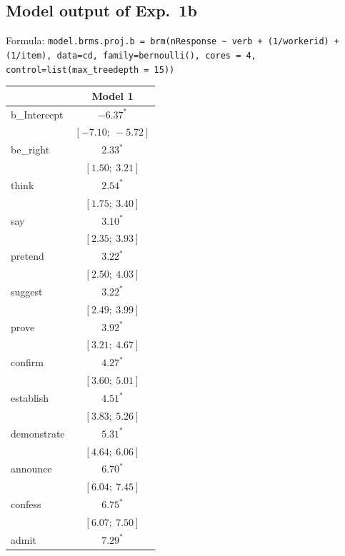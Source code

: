 \documentclass[11pt,fleqn]{article}
\newcommand{\6}{\mbox{$[\hspace*{-.6mm}[$}}
\newcommand{\9}{\mbox{$]\hspace*{-.6mm}]$}}
\begin{document}
{\subsection{Model output of Exp.~1b}

Formula: \tiny \verb|model.brms.proj.b = brm(nResponse ~ verb + (1/workerid) + (1/item), data=cd, family=bernoulli(), cores = 4, control=list(max_treedepth = 15))| \normalsize

\begin{table}
\begin{center}
\begin{tabular}{l c }
\hline
 & Model 1 \\
\hline
b\_Intercept       & $-6.37^{*}$       \\
                   & $[-7.10;\ -5.72]$ \\
be\_right   & $2.33^{*}$        \\
                   & $[1.50;\ 3.21]$   \\
think       & $2.54^{*}$        \\
                   & $[1.75;\ 3.40]$   \\
say         & $3.10^{*}$        \\
                   & $[2.35;\ 3.93]$   \\
pretend     & $3.22^{*}$        \\
                   & $[2.50;\ 4.03]$   \\
suggest     & $3.22^{*}$        \\
                   & $[2.49;\ 3.99]$   \\
prove       & $3.92^{*}$        \\
                   & $[3.21;\ 4.67]$   \\
confirm     & $4.27^{*}$        \\
                   & $[3.60;\ 5.01]$   \\
establish   & $4.51^{*}$        \\
                   & $[3.83;\ 5.26]$   \\
demonstrate & $5.31^{*}$        \\
                   & $[4.64;\ 6.06]$   \\
announce    & $6.70^{*}$        \\
                   & $[6.04;\ 7.45]$   \\
confess     & $6.75^{*}$        \\
                   & $[6.07;\ 7.50]$   \\
admit       & $7.29^{*}$        \\

\end{tabular}
\end{center}
\end{table}}
\end{document}
